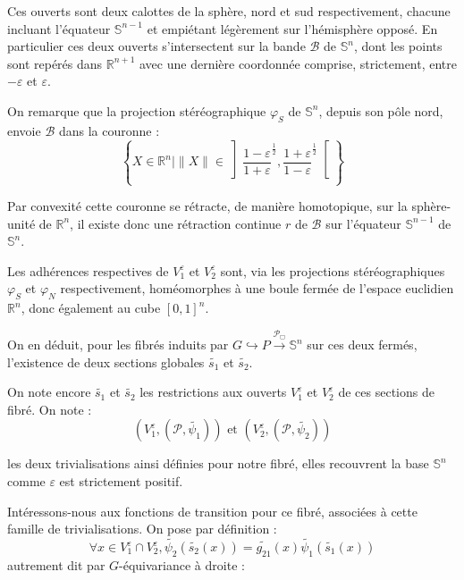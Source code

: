 \par
Ces ouverts sont deux calottes de la sphère, nord et sud respectivement, %
chacune incluant l'équateur $\mathbb{S}^{n-1}$ et empiétant légèrement sur l'hémisphère opposé. %
En particulier ces deux ouverts s'intersectent sur la bande $\mathcal{B}$ de $\mathbb{S}^n$, %
dont les points sont repérés dans $\mathbb{R}^{n+1}$ avec une dernière coordonnée comprise, strictement, entre $-\varepsilon$ et $\varepsilon$.

\par
On remarque que la projection stéréographique $\varphi_S$ de $\mathbb{S}^n$, depuis son pôle nord, envoie $\mathcal{B}$ dans la couronne :
\[
\left\{ X \in \mathbb{R}^n | \|X\| \in \left] \frac{1-\varepsilon}{1+\varepsilon}^{\frac{1}{2}} , \frac{1+\varepsilon}{1-\varepsilon}^{\frac{1}{2}} \right[ \right\}
\]

Par convexité cette couronne se rétracte, de manière homotopique, sur la sphère-unité de $\mathbb{R}^n$, %
il existe donc une rétraction continue $r$ de $\mathcal{B}$ sur l'équateur $\mathbb{S}^{n-1}$ de $\mathbb{S}^n$.

\par
Les adhérences respectives de $V_1^{\varepsilon}$ et $V_2^{\varepsilon}$ sont, via les projections stéréographiques $\varphi_S$ et $\varphi_N$ respectivement, %
homéomorphes à une boule fermée de l'espace euclidien $\mathbb{R}^n$, donc également au cube $[0,1]^n$.

\par
On en déduit, pour les fibrés induits par $G \hookrightarrow P \xrightarrow{\mathcal{P}_{\Box}} \mathbb{S}^n$ sur ces deux fermés, %
l'existence de deux sections globales $\tilde{s_1}$ et $\tilde{s_2}$.

\par
On note encore $\tilde{s_1}$ et $\tilde{s_2}$ les restrictions aux ouverts $V_1^{\varepsilon}$ et $V_2^{\varepsilon}$ de ces sections de fibré. On note :
\[(V_1^{\varepsilon},(\mathcal{P},\tilde{\psi_1}))\text{ et }(V_2^{\varepsilon},(\mathcal{P},\tilde{\psi_2}))\]

les deux trivialisations ainsi définies pour notre fibré, elles recouvrent la base $\mathbb{S}^n$ comme $\varepsilon$ est strictement positif.

\par
Intéressons-nous aux fonctions de transition pour ce fibré, associées à cette famille de trivialisations. On pose par définition :
\[
\forall x \in V_1^{\varepsilon} \cap V_2^{\varepsilon} , \tilde{\psi_2}(\tilde{s_2}(x)) = \tilde{g_{21}}(x) \tilde{\psi_1}(\tilde{s_1}(x))
\]
autrement dit par $G$-équivariance à droite :

